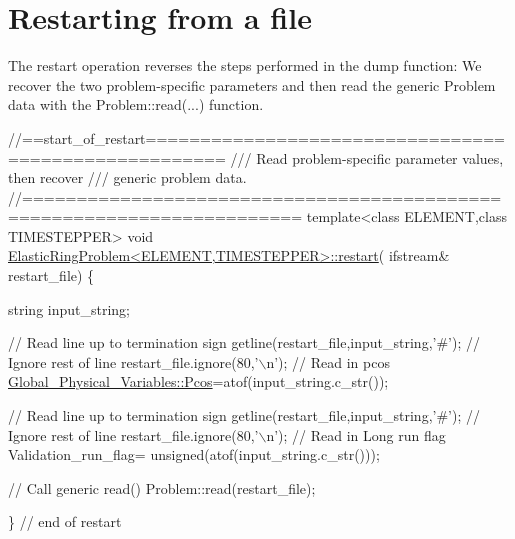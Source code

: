  

\hypertarget{index_restart}{}\section{Restarting from a file}\label{index_restart}
The restart operation reverses the steps performed in the dump function\+: We recover the two problem-\/specific parameters and then read the generic {\ttfamily Problem} data with the {\ttfamily Problem\+::read}(...) function.


\begin{DoxyCodeInclude}
\textcolor{comment}{//==start\_of\_restart=====================================================}
\textcolor{comment}{/// Read problem-specific parameter values, then recover}
\textcolor{comment}{}\textcolor{comment}{/// generic problem data.}
\textcolor{comment}{}\textcolor{comment}{//=======================================================================}
\textcolor{keyword}{template}<\textcolor{keyword}{class} ELEMENT,\textcolor{keyword}{class} TIMESTEPPER>
\textcolor{keywordtype}{void} \hyperlink{classElasticRingProblem_a0b7d864f52a18bb2a9f3a2378d8b02aa}{ElasticRingProblem<ELEMENT,TIMESTEPPER>::restart}(
      ifstream& restart\_file)
\{
  
 \textcolor{keywordtype}{string} input\_string;

 \textcolor{comment}{// Read line up to termination sign}
 getline(restart\_file,input\_string,\textcolor{charliteral}{'#'});
 \textcolor{comment}{// Ignore rest of line}
 restart\_file.ignore(80,\textcolor{charliteral}{'\(\backslash\)n'});
 \textcolor{comment}{// Read in pcos}
 \hyperlink{namespaceGlobal__Physical__Variables_ab55734aaa66260cd9d4bf68a4ecafdd5}{Global\_Physical\_Variables::Pcos}=atof(input\_string.c\_str());
 
 \textcolor{comment}{// Read line up to termination sign}
 getline(restart\_file,input\_string,\textcolor{charliteral}{'#'});
 \textcolor{comment}{// Ignore rest of line}
 restart\_file.ignore(80,\textcolor{charliteral}{'\(\backslash\)n'});
 \textcolor{comment}{// Read in Long run flag}
 Validation\_run\_flag=
  unsigned(atof(input\_string.c\_str()));

 \textcolor{comment}{// Call generic read()}
 Problem::read(restart\_file);

\} \textcolor{comment}{// end of restart}

\end{DoxyCodeInclude}




